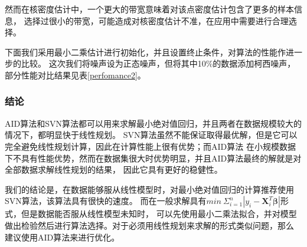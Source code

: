然而在核密度估计中，一个更大的带宽意味着对该点密度估计包含了更多的样本信息，
选择过很小的带宽，可能造成对核密度估计不准，在应用中需要进行合理选择。

下面我们采用最小二乘估计进行初始化，并且设置终止条件，对算法的性能作进一步的比较。
这次我们将噪声设为正态噪声，但将其中10\%的数据添加柯西噪声，部分性能对比结果见表\ref{perfomance2}。

\begin{table}[H]
    \small
    \caption{部分性能结果对比}\label{perfomance2}
\end{table}
\subsubsection{结论}
AID算法和SVN算法都可以用来求解最小绝对值回归，并且两者在数据规模较大的情况下，都明显快于线性规划。
SVN算法虽然不能保证取得最优解，但是它可以完全避免线性规划计算，因此在计算性能上很有优势；而AID算法
在小规模数据下不具有性能优势，然而在数据集很大时优势明显，并且AID算法最终的解就是对全部数据求解线性规划的结果，
因此它具有更好的稳健性。

我们的结论是，在数据能够服从线性模型时，对最小绝对值回归的计算推荐使用SVN算法，该算法具有很快的速度。
而在一般求解具有$min\ \Sigma_{i=1}^{n} |y_i - \bm{X}_i^T\bm{\beta}|$形式，但是数据能否服从线性模型未知时，
可以先使用最小二乘法拟合，并对模型做出检验然后进行算法选择。对于必须用线性规划来求解的形式类似问题，那么
建议使用AID算法来进行优化。

